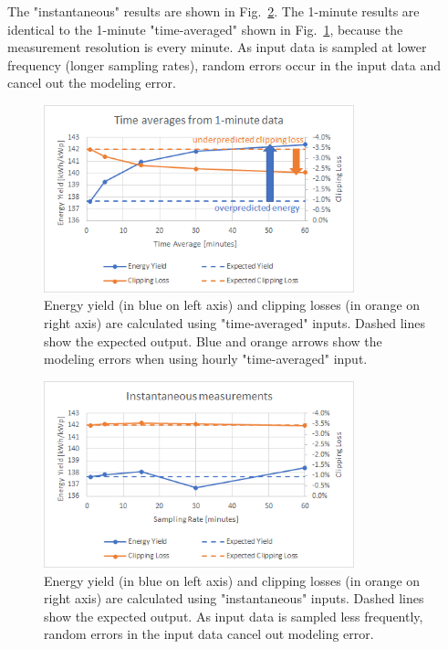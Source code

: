 \documentclass[conference]{IEEEtran}
\begin{document}
The "instantaneous" results are shown in Fig.~\ref{fig:instantaneous}. The 1-minute results are identical to the 1-minute "time-averaged" shown in Fig.~\ref{fig:time-averaged}, because the measurement resolution is every minute. As input data is sampled at lower frequency (longer sampling rates), random errors occur in the input data and cancel out the modeling error.

\begin{figure}[htbp]
\centerline{\includegraphics[width=9cm]{time-averaged.png}}
\caption{Energy yield (in blue on left axis) and clipping losses (in orange on right axis) are calculated using "time-averaged" inputs. Dashed lines show the expected output. Blue and orange arrows show the modeling errors when using hourly "time-averaged" input.}
\label{fig:time-averaged}
\end{figure}

\begin{figure}[htbp]
\centerline{\includegraphics[width=9cm]{instantaneous.png}}
\caption{Energy yield (in blue on left axis) and clipping losses (in orange on right axis) are calculated using "instantaneous" inputs. Dashed lines show the expected output. As input data is sampled less frequently, random errors in the input data cancel out modeling error.}
\label{fig:instantaneous}
\end{figure}
\end{document}

